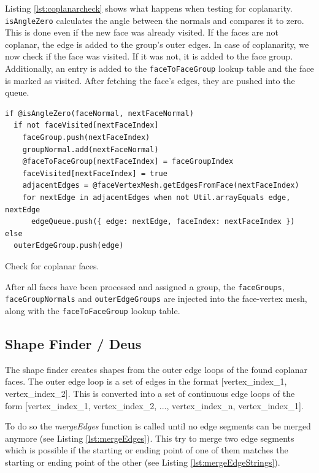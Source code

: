 \documentclass[../ClassicThesis.tex]{subfiles}
\begin{document}
Listing \ref{lst:coplanarcheck} shows what happens when testing for coplanarity. \texttt{isAngleZero} calculates the angle between the normals and compares it to zero. This is done even if the new face was already visited. If the faces are not coplanar, the edge is added to the group's outer edges. In case of coplanarity, we now check if the face was visited. If it was not, it is added to the face group. Additionally, an entry is added to the \texttt{faceToFaceGroup} lookup table and the face is marked as visited. After fetching the face's edges, they are pushed into the queue.

\begin{listing}
\begin{verbatim}
if @isAngleZero(faceNormal, nextFaceNormal)
  if not faceVisited[nextFaceIndex]
    faceGroup.push(nextFaceIndex)
    groupNormal.add(nextFaceNormal)
    @faceToFaceGroup[nextFaceIndex] = faceGroupIndex
    faceVisited[nextFaceIndex] = true
    adjacentEdges = @faceVertexMesh.getEdgesFromFace(nextFaceIndex)
    for nextEdge in adjacentEdges when not Util.arrayEquals edge, nextEdge
      edgeQueue.push({ edge: nextEdge, faceIndex: nextFaceIndex })
else
  outerEdgeGroup.push(edge)
\end{verbatim}
\caption{Check for coplanar faces.}
\label{lst:coplanarcheck}
\end{listing}

After all faces have been processed and assigned a group, the \texttt{faceGroups}, \texttt{faceGroupNormals} and \texttt{outerEdgeGroups} are injected into the face-vertex mesh, along with the \texttt{faceToFaceGroup} lookup table.

\subsection{Shape Finder / Deus}\label{sub:shapesfinder}

The shape finder creates shapes from the outer edge loops of the found coplanar faces. The outer edge loop is a set of edges in the format [vertex\_index\_1, vertex\_index\_2]. This is converted into a set of continuous edge loops of the form [vertex\_index\_1, vertex\_index\_2, ..., vertex\_index\_n, vertex\_index\_1].

To do so the \emph{mergeEdges} function is called until no edge segments can be merged anymore (see Listing \ref{lst:mergeEdges}). This try to merge two edge segments which is possible if the starting or ending point of one of them matches the starting or ending point of the other (see Listing \ref{lst:mergeEdgeStrings}).
\end{document}
